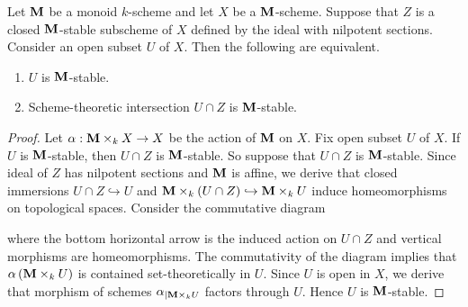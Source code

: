 \begin{proposition}\label{proposition:monoid_open_stable_correspondence}
Let $\mathbf{M}$ be a monoid $k$-scheme and let $X$ be a $\mathbf{M}$-scheme. Suppose that $Z$ is a closed $\mathbf{M}$-stable subscheme of $X$ defined by the ideal with nilpotent sections. Consider an open subset $U$ of $X$. Then the following are equivalent.
\begin{enumerate}[label=\emph{\textbf{(\arabic*)}}, leftmargin=3.0em]
\item $U$ is $\mathbf{M}$-stable.
\item Scheme-theoretic intersection $U\cap Z$ is $\mathbf{M}$-stable.
\end{enumerate}
\end{proposition}
\begin{proof}
Let $\alpha:\mathbf{M} \times_k X\rightarrow X$ be the action of $\mathbf{M}$ on $X$. Fix open subset $U$ of $X$. If $U$ is $\mathbf{M}$-stable, then $U\cap Z$ is $\mathbf{M}$-stable. So suppose that $U\cap Z$ is $\mathbf{M}$-stable. Since ideal of $Z$ has nilpotent sections and $\mathbf{M}$ is affine, we derive that closed immersions $U\cap Z\hookrightarrow U$ and $\mathbf{M}\times_k \left(U\cap Z\right) \hookrightarrow \mathbf{M}\times_k U$ induce homeomorphisms on topological spaces. Consider the commutative diagram
\begin{center}
\end{center}
where the bottom horizontal arrow is the induced action on $U\cap Z$ and vertical morphisms are homeomorphisms. The commutativity of the diagram implies that $\alpha\left(\mathbf{M}\times_k U\right)$ is contained set-theoretically in $U$. Since $U$ is open in $X$, we derive that morphism of schemes $\alpha_{\mid \mathbf{M}\times_k U}$ factors through $U$. Hence $U$ is $\mathbf{M}$-stable.
\end{proof}

